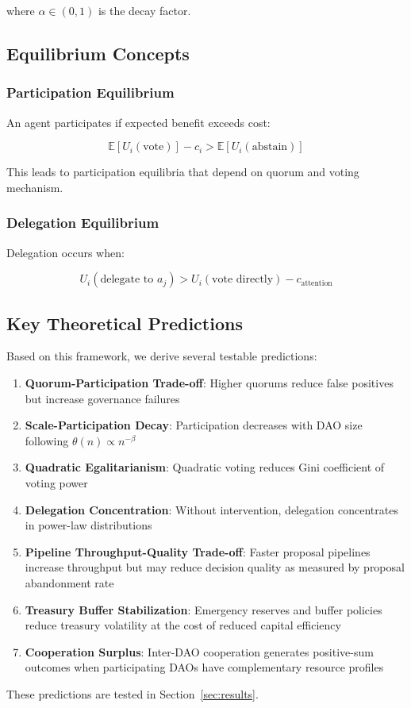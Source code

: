 where $\alpha \in (0, 1)$ is the decay factor.

\subsection{Equilibrium Concepts}

\subsubsection{Participation Equilibrium}

An agent participates if expected benefit exceeds cost:

\begin{equation}
\mathbb{E}[U_i(\text{vote})] - c_i > \mathbb{E}[U_i(\text{abstain})]
\end{equation}

This leads to participation equilibria that depend on quorum and voting mechanism.

\subsubsection{Delegation Equilibrium}

Delegation occurs when:

\begin{equation}
U_i(\text{delegate to } a_j) > U_i(\text{vote directly}) - c_{\text{attention}}
\end{equation}

\subsection{Key Theoretical Predictions}

Based on this framework, we derive several testable predictions:

\begin{enumerate}
    \item \textbf{Quorum-Participation Trade-off}: Higher quorums reduce false positives but increase governance failures
    \item \textbf{Scale-Participation Decay}: Participation decreases with DAO size following $\theta(n) \propto n^{-\beta}$
    \item \textbf{Quadratic Egalitarianism}: Quadratic voting reduces Gini coefficient of voting power
    \item \textbf{Delegation Concentration}: Without intervention, delegation concentrates in power-law distributions
    \item \textbf{Pipeline Throughput-Quality Trade-off}: Faster proposal pipelines increase throughput but may reduce decision quality as measured by proposal abandonment rate
    \item \textbf{Treasury Buffer Stabilization}: Emergency reserves and buffer policies reduce treasury volatility at the cost of reduced capital efficiency
    \item \textbf{Cooperation Surplus}: Inter-DAO cooperation generates positive-sum outcomes when participating DAOs have complementary resource profiles
\end{enumerate}

These predictions are tested in Section~\ref{sec:results}.
